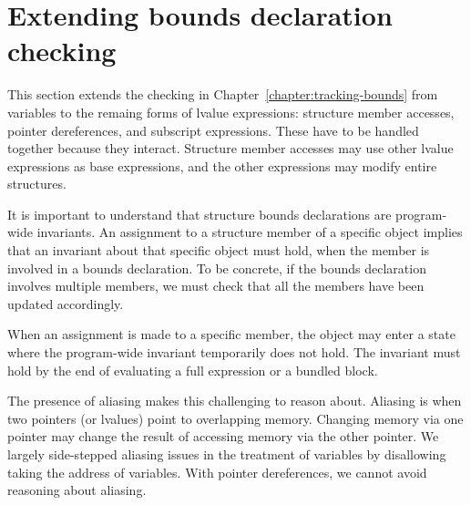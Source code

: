 \section{Extending bounds declaration checking}
\label{section:checking-bounds-with-structures}

This section extends the checking in Chapter~\ref{chapter:tracking-bounds} from
variables to the remaing forms of lvalue expressions: structure member accesses, pointer
dereferences, and subscript expressions.  These have to be handled together because
they interact.  Structure member accesses may use other lvalue expressions as 
base expressions, and the other expressions may modify entire structures.

It is important to understand that structure bounds declarations are program-wide invariants.
An assignment to a structure member of a specific object implies that an invariant about
that specific object must hold, when the member is involved in a bounds declaration.
To be concrete, if the bounds declaration involves multiple members, we must check
that all the members have been updated accordingly.  

When an assignment is made to a specific member, the object may enter a state where the
program-wide invariant temporarily does not hold.  The invariant must hold by the end of evaluating 
a full expression or a bundled block.

The presence of aliasing makes this challenging to reason about.  Aliasing is when two pointers
(or lvalues) point to overlapping memory.   Changing memory via one pointer may change the
result of accessing memory via the other pointer.  We largely side-stepped aliasing issues in the
treatment of variables by disallowing taking the address of variables.  With pointer dereferences,
we cannot avoid reasoning about aliasing.

